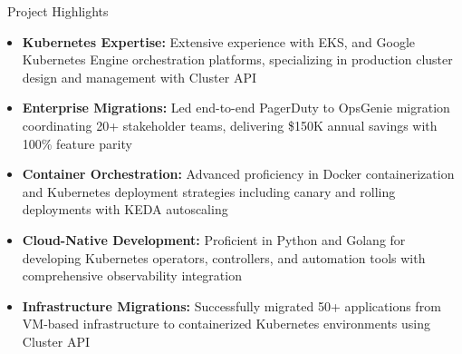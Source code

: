\documentclass{resume} %
\begin{document}

\begin{rSection}{{\color{sectioncolor}\faRocket}\ Project Highlights}
\smallbreak
\begin{itemize}[leftmargin=1em, nosep]
\item \textbf{Kubernetes Expertise:} Extensive experience with EKS, and Google Kubernetes Engine orchestration platforms, specializing in production cluster design and management with Cluster API
\item \textbf{Enterprise Migrations:} Led end-to-end PagerDuty to OpsGenie migration coordinating 20+ stakeholder teams, delivering \$150K annual savings with 100\% feature parity
\item \textbf{Container Orchestration:} Advanced proficiency in Docker containerization and Kubernetes deployment strategies including canary and rolling deployments with KEDA autoscaling
\item \textbf{Cloud-Native Development:} Proficient in Python and Golang for developing Kubernetes operators, controllers, and automation tools with comprehensive observability integration
\item \textbf{Infrastructure Migrations:} Successfully migrated 50+ applications from VM-based infrastructure to containerized Kubernetes environments using Cluster API
\end{itemize}
\end{rSection}

\end{document}

